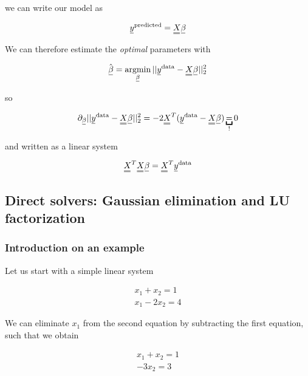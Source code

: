 we can write our model as

\begin{equation}
    \vec{y}^{\text{predicted}} = \mat{X} \vec{\beta}
\end{equation}

We can therefore estimate the \textit{optimal} parameters with

\begin{equation}
    \hat{\vec{\beta}} = \argmin_{\vec{\beta}}{||\vec{y}^{\text{data}} - \mat{X} \vec{\beta}||_2^2}
\end{equation}

so

\begin{equation}
    \partial_{\vec{\beta}} ||\vec{y}^{\text{data}} - \mat{X} \vec{\beta}||_2^2 = -2 \mat{X}^T(\vec{y}^{\text{data}}-\mat{X} \vec{\beta}) \underbracket{=}_{!} 0
\end{equation}

and written as a linear system

\begin{equation}
   \mat{X}^T \mat{X} \vec{\beta} = \mat{X}^T \vec{y}^{\text{data}}
\end{equation}

\subsection{Direct solvers: Gaussian elimination and LU factorization}

\subsubsection{Introduction on an example}

Let us start with a simple linear system

\begin{equation}
    \begin{aligned}
        x_1 + x_2 = 1 \\
        x_1 - 2x_2 = 4
    \end{aligned}
\end{equation}

We can eliminate $x_1$ from the second equation by subtracting the first
equation, such that we obtain

\begin{equation}
    \begin{aligned}
        x_1 + x_2 = 1 \\
        - 3x_2 = 3
    \end{aligned}
\end{equation}

